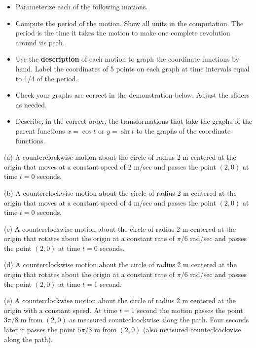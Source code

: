 \documentclass{ximera}
\begin{document}
\begin{example}
\begin{itemize}

\item{Parameterize each of the following motions.}

\item{Compute the period of the motion. Show all units in the computation. The period is the time it takes the motion to make one complete revolution around its path.}

\item{Use the {\bf description} of each motion to graph the coordinate functions by hand. Label the coordinates of 5 points on each graph at time intervals equal to 1/4 of the period.}

\item{Check your graphs are correct in the demonstration below. Adjust the sliders as needed.}

\item{Describe, in the correct order, the transformations that take the graphs of the parent functions $x=\cos t$ or $y=\sin t$ to the graphs of the coordinate functions.}

\end{itemize}

(a) A counterclockwise motion about the circle of radius 2 m centered at the origin that moves at a constant speed of 2 m/sec and passes the point $(2,0)$ at time $t=0$ seconds.

(b) A counterclockwise motion about the circle of radius 2 m centered at the origin that moves at a constant speed of 4 m/sec and passes the point $(2,0)$ at time $t=0$ seconds.

(c) A counterclockwise motion about the circle of radius 2 m centered at the origin that rotates about the origin at a constant rate of $\pi/6$ rad/sec and passes the point $(2,0)$ at time $t=0$ seconds.

(d) A counterclockwise motion about the circle of radius 2 m centered at the origin that rotates about the origin at a constant rate of $\pi/6$ rad/sec and passes the point $(2,0)$ at time $t=1$ second.

(e) A counterclockwise motion about the circle of radius 2 m centered at the origin with a constant speed. At time $t=1$ second the motion passes the point $3\pi/8$ m from $(2,0)$ as measured counteclcockwise along the path. Four seconds later it passes the point $5\pi/8$ m from $(2,0)$ (also measured counteclcockwise along the path).

\begin{exploration}
 
\begin{onlineOnly}
    \begin{center}
\end{center}
\end{onlineOnly}
\end{exploration}


\end{example}
\end{document}
